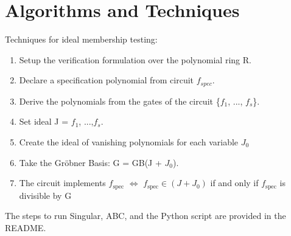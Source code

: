 \documentclass[conference]{IEEEtran}
\begin{document}
\section{Algorithms and Techniques}
Techniques for ideal membership testing: 
\begin{enumerate}
    \item Setup the verification formulation over the polynomial ring R. 
    \item Declare a specification polynomial from circuit $f_{spec}$.
    \item Derive the polynomials from the gates of the circuit \{$f_{1}$, ..., $f_{s}$\}. 
    \item Set ideal J = $f_{1}$, ...,$f_{s}$.    
    \item Create the ideal of vanishing polynomials for each variable $J_{0}$
    \item Take the Gröbner Basis: G = GB(J + $J_{0}$).  
    \item The circuit implements \(f_{\text{spec}}\) \(\Longleftrightarrow\) \(f_{\text{spec}} \in (J + J_0)\) if and only if \(f_{\text{spec}}\)
    is divisible by G
\end{enumerate}
The steps to run Singular, ABC, and the Python script are provided in the README. 
\end{document}
